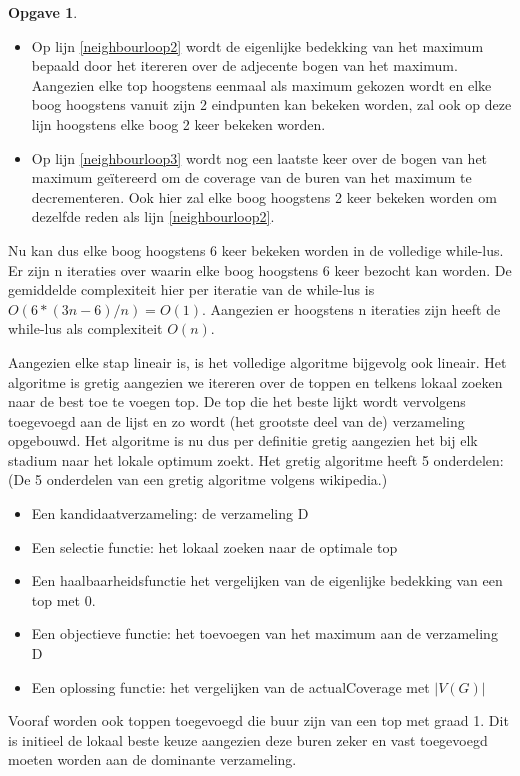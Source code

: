 \documentclass[11pt, a4paper, table]{article}
\theoremstyle{definition}
\newtheorem{opgave}{Opgave}
\theoremstyle{definition}
\theoremstyle{definition}
\begin{document}
\begin{opgave}
\begin{itemize}
\begin{itemize}
				\item Op lijn \ref{neighbourloop2} wordt de eigenlijke bedekking van het maximum bepaald door het itereren over de adjecente bogen van het maximum. Aangezien elke top hoogstens eenmaal als maximum gekozen wordt en elke boog hoogstens vanuit zijn 2 eindpunten kan bekeken worden, zal ook op deze lijn hoogstens elke boog 2 keer bekeken worden. 
				\item Op lijn \ref{neighbourloop3} wordt nog een laatste keer over de bogen van het maximum ge\"itereerd om de coverage van de buren van het maximum te decrementeren. 
				Ook hier zal elke boog hoogstens 2 keer bekeken worden om dezelfde reden als lijn \ref{neighbourloop2}.
			\end{itemize}
			
			 Nu kan dus elke boog hoogstens 6 keer bekeken worden in de volledige while-lus. Er zijn n iteraties over waarin elke boog hoogstens 6 keer bezocht kan worden. De gemiddelde complexiteit hier per iteratie van de while-lus is $O(6*(3n-6)/n)=O(1)$. Aangezien er hoogstens n iteraties zijn heeft de while-lus als complexiteit $O(n)$. 
	\end{itemize}
		Aangezien elke stap lineair is, is het volledige algoritme bijgevolg ook lineair. 
		\vspace{0.1cm}
		\newline
		Het algoritme is gretig aangezien we itereren over de toppen en telkens lokaal zoeken naar de best toe te voegen top. De top die het beste lijkt wordt vervolgens toegevoegd aan de lijst en zo wordt (het grootste deel van de) verzameling opgebouwd. Het algoritme is nu dus per definitie gretig aangezien het bij elk stadium naar het lokale optimum zoekt.
		Het gretig algoritme heeft 5 onderdelen: (De 5 onderdelen van een gretig algoritme volgens wikipedia.)
		\begin{itemize}
			\item Een kandidaatverzameling: de verzameling D
			\item Een selectie functie: het lokaal zoeken naar de optimale top
			\item Een haalbaarheidsfunctie het vergelijken van de eigenlijke bedekking van een top met 0. 
			\item Een objectieve functie: het toevoegen van het maximum aan de verzameling D
			\item Een oplossing functie: het vergelijken van de actualCoverage met $|V(G)|$
		\end{itemize} 
	 Vooraf worden ook toppen toegevoegd die buur zijn van een top met graad 1. Dit is initieel de lokaal beste keuze aangezien deze buren zeker en vast toegevoegd moeten worden aan de dominante verzameling. 

\end{opgave}
\end{document}
